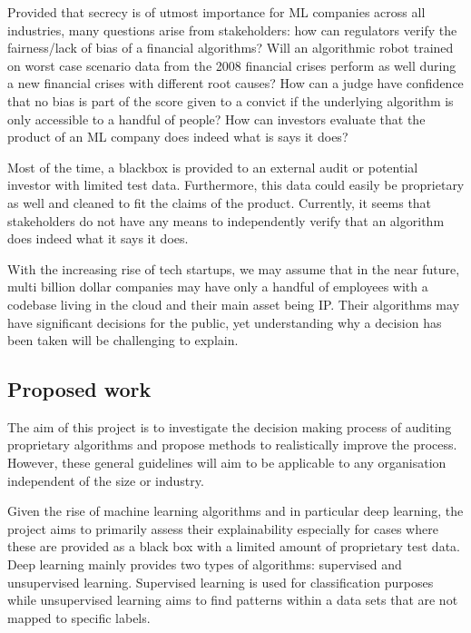 \documentclass[proposal]{softeng}
\begin{document}
Provided that secrecy is of utmost importance for ML companies across all industries, many questions arise from stakeholders: how can regulators verify the fairness/lack of bias of a financial algorithms? Will an algorithmic robot trained on worst case scenario data from the 2008 financial crises perform as well during a new financial crises with different root causes? How can a judge have confidence that no bias is part of the score given to a convict if the underlying algorithm is only accessible to a handful of people? How can investors evaluate that the product of an ML company does indeed what is says it does?

Most of the time, a blackbox is provided to an external audit or potential investor with limited test data. Furthermore, this data could easily be proprietary as well and cleaned to fit the claims of the product. Currently, it seems that stakeholders do not have any means to independently verify that an algorithm does indeed what it says it does. 

With the increasing rise of tech startups, we may assume that in the near future, multi billion dollar companies may have only a handful of employees with a codebase living in the cloud and their main asset being IP. Their algorithms may have significant decisions for the public, yet understanding why a decision has been taken will be challenging to explain.



\subsection{Proposed work}

The aim of this project is to investigate the decision making process of auditing proprietary algorithms and propose methods to realistically improve the process. However, these general guidelines will aim to be applicable to any organisation independent of the size or industry.

Given the rise of machine learning algorithms and in particular deep learning, the project aims to primarily assess their explainability especially for cases where these are provided as a black box with a limited amount of proprietary test data. Deep learning mainly provides two types of algorithms: supervised and unsupervised learning. Supervised learning is used for classification purposes while unsupervised learning aims to find patterns within a data sets that are not mapped to specific labels.
\end{document}
